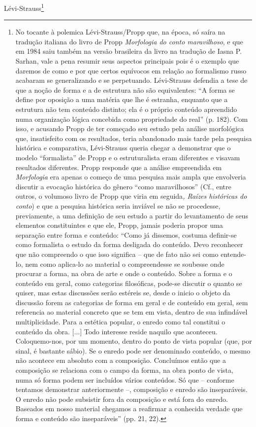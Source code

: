 Lévi-Strauss\footnote{No tocante à polemica Lévi-Strauss/Propp que, na
  época, só saíra na tradução italiana do livro de Propp
  \emph{Morfologia do conto maravilhoso}, e que em 1984 saiu também na
  versão brasileira da livro na tradução de Iasna P. Sarhan, vale a pena
  resumir seus aspectos principais pois é o exemplo que daremos de como
  e por que certos equívocos em relação ao formalismo russo acabaram se
  generalizando e se perpetuando. Lévi-Strauss defendia a tese de que a
  noção de forma e a de estrutura não são equivalentes: ``A forma se
  define por oposição a uma matéria que lhe é estranha, enquanto que a
  estrutura não tem conteúdo distinto; ela é o próprio conteúdo
  apreendido numa organização lógica concebida como propriedade do
  real'' (p. 182). Com isso, e acusando Propp de ter começado seu estudo
  pela análise morfológica que, insatisfeito com os resultados, teria
  abandonado mais tarde pela pesquisa histórica e comparativa,
  Lévi-Strauss queria chegar a demonstrar que o modelo ``formalista'' de
  Propp e o estruturalista eram diferentes e visavam resultados
  diferentes. Propp responde que a análise empreendida em
  \emph{Morfologia} era apenas o começo de uma pesquisa mais ampla que
  envolveria discutir a evocação histórica do gênero ``como
  maravilhosos'' (Cf., entre outros, o volumoso livro de Propp que viria
  em seguida\emph{, Raízes históricas do conto}) e que a pesquisa
  histórica seria inviável se não se procedesse, previamente, a uma
  definição de seu estudo a partir do levantamento de seus elementos
  constituintes e que ele, Propp, jamais poderia propor uma separação
  entre forma e conteúdo: ``Como já dissemos, costuma definir-se como
  formalista o estudo da forma desligada do conteúdo. Devo reconhecer
  que não compreendo o que isso significa -- que de fato não sei como
  entende-lo, nem como aplica-lo ao material o compreendesse se soubesse
  onde procurar a forma, na obra de arte e onde o conteúdo. Sobre a
  forma e o conteúdo em geral, como categorias filosóficas, pode-se
  discutir o quanto se quiser, mas estas discussões serão estéreis se,
  desde o inicio o objeto da discussão forem as categorias de forma em
  geral e de conteúdo em geral, sem referencia ao material concreto que
  se tem em vista, dentro de sua infindável multiplicidade. Para a
  estética popular, o enredo como tal constitui o conteúdo da obra.
  {[}...{]} Todo interesse reside naquilo que aconteceu. Coloquemo-nos,
  por um momento, dentro do ponto de vista popular (que, por sinal, é
  bastante sábio). Se o enredo pode ser denominado conteúdo, o mesmo não
  acontece em absoluto com a composição. Concluímos então que a
  composição se relaciona com o campo da forma, na obra ponto de vista,
  numa só forma podem ser incluídos vários conteúdos. Só que -- conforme
  tentamos demonstrar anteriormente --, composição e enredo são
  inseparáveis. O enredo não pode subsistir fora da composição e está
  fora do enredo. Baseados em nosso material chegamos a reafirmar a
  conhecida verdade que forma e conteúdo são inseparáveis'' (pp. 21,
  22).

}
